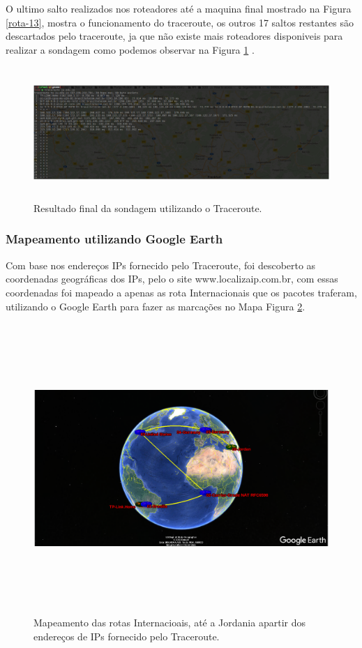 \documentclass[
	article,			%
	11pt,				%
	oneside,			%
	a4paper,			%
	english,			%
	brazil,				%
	sumario=tradicional
	]{abntex2}
\begin{document}
	O ultimo salto realizados nos roteadores até a maquina final mostrado na Figura \ref{rota-13}, mostra o funcionamento do traceroute, os outros 17 saltos restantes são descartados pelo traceroute, ja que não existe mais roteadores disponiveis para realizar a sondagem como podemos observar na Figura \ref{traceroute} .
\begin{figure}[H]
	\centering
	\includegraphics[width=15cm,height=5cm]{./trauceroute-1.png}
	\caption{Resultado final da sondagem utilizando o Traceroute.}
	\label{traceroute}
\end{figure}
	 

\subsubsection{Mapeamento utilizando Google Earth }
	Com base nos endereços IPs fornecido pelo Traceroute, foi descoberto as coordenadas geográficas dos IPs, pelo o site www.localizaip.com.br, com essas coordenadas foi mapeado a apenas as rota Internacionais que os pacotes traferam, utilizando o Google Earth para fazer as marcações no Mapa Figura \ref{google-earth}.
\begin{figure}[H]
	\centering
	\includegraphics[width=15cm,height=11cm]{./google-earh.png}
	\caption{Mapeamento das rotas Internacioais, até a Jordania apartir dos endereços de IPs fornecido pelo Traceroute.}
	\label{google-earth}
\end{figure}
\end{document}
